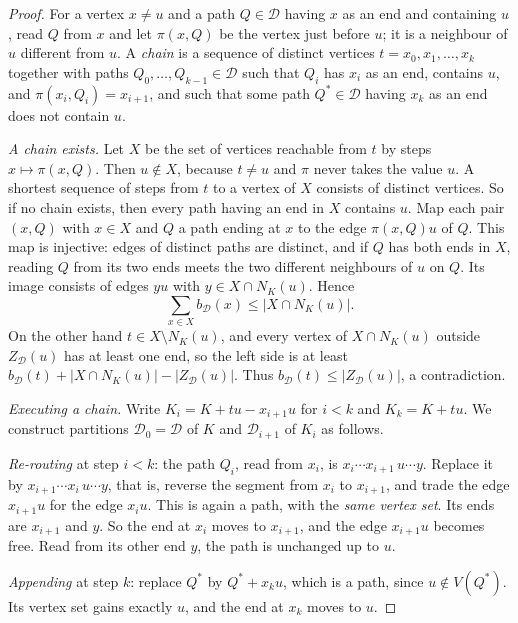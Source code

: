 \documentclass[11pt]{amsart}
\theoremstyle{definition}
\newcommand{\cD}{\mathcal D}
\begin{document}
\begin{proof}
For a vertex $x\neq u$ and a path $Q\in\cD$ having $x$ as an end and containing $u$, read $Q$ from $x$ and
let $\pi(x,Q)$ be the vertex just before $u$; it is a neighbour of $u$ different from $u$. A \emph{chain}
is a sequence of distinct vertices $t=x_0,x_1,\dots,x_k$ together with paths $Q_0,\dots,Q_{k-1}\in\cD$ such
that $Q_i$ has $x_i$ as an end, contains $u$, and $\pi(x_i,Q_i)=x_{i+1}$, and such that some path
$Q^\ast\in\cD$ having $x_k$ as an end does not contain $u$.

\emph{A chain exists.} Let $X$ be the set of vertices reachable from $t$ by steps $x\mapsto\pi(x,Q)$. Then
$u\notin X$, because $t\neq u$ and $\pi$ never takes the value $u$. A shortest sequence of steps from $t$ to
a vertex of $X$ consists of distinct vertices. So if no chain exists, then every path having an end in $X$
contains $u$. Map each pair $(x,Q)$ with $x\in X$ and $Q$ a path ending at $x$ to the edge
$\pi(x,Q)u$ of $Q$. This map is injective: edges of distinct paths are distinct, and if $Q$ has both
ends in $X$, reading $Q$ from its two ends meets the two different neighbours of $u$ on $Q$. Its image
consists of edges $yu$ with $y\in X\cap N_K(u)$. Hence
\[
\sum_{x\in X}b_\cD(x)\le|X\cap N_K(u)|.
\]
On the other hand $t\in X\setminus N_K(u)$, and every vertex of $X\cap N_K(u)$ outside $Z_\cD(u)$ has at
least one end, so the left side is at least $b_\cD(t)+|X\cap N_K(u)|-|Z_\cD(u)|$. Thus
$b_\cD(t)\le|Z_\cD(u)|$, a contradiction.

\emph{Executing a chain.} Write $K_i=K+tu-x_{i+1}u$ for $i<k$ and $K_k=K+tu$. We construct partitions
$\cD_0=\cD$ of $K$ and $\cD_{i+1}$ of $K_i$ as follows.

\emph{Re-routing} at step $i<k$: the path $Q_i$, read from $x_i$, is $x_i\cdots x_{i+1}\,u\cdots y$.
Replace it by $x_{i+1}\cdots x_i\,u\cdots y$, that is, reverse the segment from $x_i$ to $x_{i+1}$, and
trade the edge $x_{i+1}u$ for the edge $x_iu$. This is again a path, with the \emph{same vertex set}. Its
ends are $x_{i+1}$ and $y$. So the end at $x_i$ moves to $x_{i+1}$, and the edge $x_{i+1}u$ becomes free.
Read from its other end $y$, the path is unchanged up to $u$.

\emph{Appending} at step $k$: replace $Q^\ast$ by $Q^\ast+x_ku$, which is a path, since $u\notin V(Q^\ast)$.
Its vertex set gains exactly $u$, and the end at $x_k$ moves to $u$.


\end{proof}
\end{document}
